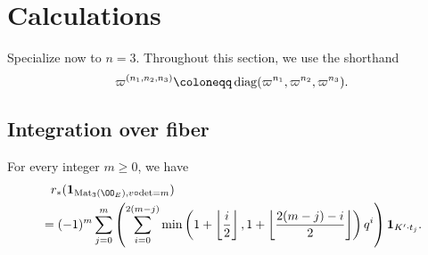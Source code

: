 \section{Calculations}
Specialize now to $n=3$.
Throughout this section, we use the shorthand
\[ \varpi^{(n_1, n_2, n_3)} \coloneqq \diag(\varpi^{n_1}, \varpi^{n_2}, \varpi^{n_3}). \]

\subsection{Integration over fiber}
\begin{proposition}
  For every integer $m \ge 0$, we have
  \begin{align*}
    &\phantom= r_\ast(\mathbf{1}_{\Mat_3(\OO_E), v\circ\det=m}) \\
    &= (-1)^m \sum_{j=0}^m \left(
      \sum_{i=0}^{2(m-j)} \min \left( 1 + \left\lfloor \frac i2 \right\rfloor,
        1 + \left\lfloor \frac{2(m-j)-i}{2} \right\rfloor \right) q^i \right)
      \mathbf{1}_{K' \cdot t_j}.
  \end{align*}
\end{proposition}
